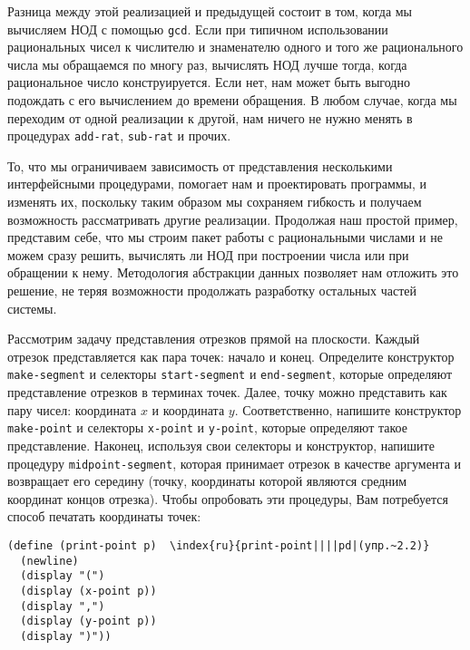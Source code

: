 Разница между этой реализацией и предыдущей состоит в том, когда мы
вычисляем НОД с помощью {\tt gcd}.  Если при типичном использовании
рациональных чисел к числителю и знаменателю одного и того же
рационального числа мы обращаемся по многу раз, вычислять НОД лучше
тогда, когда рациональное число конструируется.  Если нет, нам может
быть выгодно подождать с его вычислением до времени обращения.  В любом
случае, когда мы переходим от одной реализации к другой, нам ничего не 
нужно менять в процедурах {\tt add-rat}, {\tt sub-rat} и 
прочих.

То, что мы ограничиваем зависимость от представления
несколькими интерфейсными процедурами, помогает нам и проектировать
программы, и изменять их, поскольку таким образом мы сохраняем
гибкость и получаем возможность рассматривать другие реализации.
Продолжая наш простой пример, представим себе, что мы строим пакет
работы с рациональными числами и не можем сразу решить, вычислять ли
НОД при построении числа или при обращении к нему.  Методология
абстракции данных позволяет нам отложить это решение, не теряя
возможности продолжать разработку остальных частей системы.
\begin{exercise}{2.2}\label{EX2.2}%
%
%
Рассмотрим задачу представления отрезков прямой на
плоскости.  Каждый отрезок представляется как пара точек: начало и
конец.  Определите конструктор {\tt make-seg\-ment}
и селекторы {\tt start-segment}
и {\tt end-segment},
которые
определяют представление отрезков в терминах точек. 
Далее, точку можно представить как пару чисел: координата $x$ и
координата $y$.  Соответственно, напишите конструктор
{\tt make-point}
и селекторы {\tt x-point} и
{\tt y-point}, которые определяют такое представление.
Наконец, используя свои селекторы и конструктор, напишите процедуру
{\tt midpoint-segment}, которая принимает отрезок в качестве
аргумента и возвращает его середину (точку, координаты которой
являются средним координат концов отрезка).  Чтобы опробовать эти
процедуры, Вам потребуется способ печатать координаты точек:

\begin{Verbatim}[fontsize=\small]
(define (print-point p)  \index{ru}{print-point||||pd|(упр.~2.2)}
  (newline)
  (display "(")
  (display (x-point p))
  (display ",")
  (display (y-point p))
  (display ")"))
\end{Verbatim}

\end{exercise}
